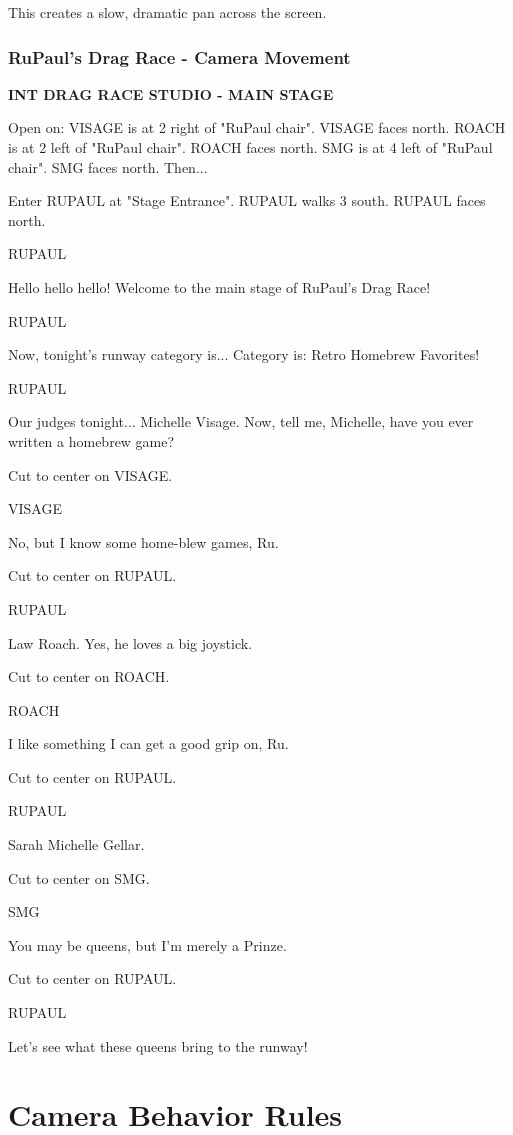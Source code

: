 \documentclass[11pt,letterpaper,oldstylefigures]{memoir}
\newcommand{\slugline}[1]{\nobreak\textbf{\MakeUppercase{#1}}\par\nobreak\vspace{1\baselineskip}}
\newcommand{\speaker}[1]{\nobreak\hspace*{0.333\textwidth}\MakeUppercase{#1}\par\nobreak\vspace{0.5\baselineskip}}
\newcommand{\dialogue}[1]{\nobreak\hspace*{0.25\textwidth}\begin{minipage}{0.5\textwidth}#1\end{minipage}\par\vspace{1\baselineskip}}
\newcommand{\stagedir}[1]{#1\par\vspace{1\baselineskip}}
\newenvironment{FountainExample}
  {\begingroup
  \ttfamily\small
   \setlength{\parindent}{0pt}
  \setlength{\parskip}{0.5em}
  \allowdisplaybreaks
  \setlength{\displaywidowpenalty}{0}
  \setlength{\widowpenalty}{0}
  \setlength{\clubpenalty}{0}
  \setlength{\interlinepenalty}{0}
}
  {\endgroup}
\begin{document}
This creates a slow, dramatic pan across the screen.

\subsubsection*{RuPaul's Drag Race - Camera Movement}
\label{ex:rupauls-drag-race-camera}

\begin{FountainExample}
\slugline{INT DRAG RACE STUDIO - MAIN STAGE}

\stagedir{Open on: VISAGE is at 2 right of "RuPaul chair". VISAGE faces north. ROACH is at 2 left of "RuPaul chair". ROACH faces north. SMG is at 4 left of "RuPaul chair". SMG faces north. Then...}
\stagedir{Enter RUPAUL at "Stage Entrance". RUPAUL walks 3 south. RUPAUL faces north.}

\speaker{RUPAUL}
\dialogue{Hello hello hello! Welcome to the main stage of RuPaul's Drag Race!}

\speaker{RUPAUL}
\dialogue{Now, tonight's runway category is... Category is: Retro Homebrew Favorites!}

\speaker{RUPAUL}
\dialogue{Our judges tonight... Michelle Visage. Now, tell me, Michelle, have you ever written a homebrew game?}

\stagedir{Cut to center on VISAGE.}

\speaker{VISAGE}
\dialogue{No, but I know some home-blew games, Ru.}

\stagedir{Cut to center on RUPAUL.}

\speaker{RUPAUL}
\dialogue{Law Roach. Yes, he loves a big joystick.}

\stagedir{Cut to center on ROACH.}

\speaker{ROACH}
\dialogue{I like something I can get a good grip on, Ru.}

\stagedir{Cut to center on RUPAUL.}

\speaker{RUPAUL}
\dialogue{Sarah Michelle Gellar.}

\stagedir{Cut to center on SMG.}

\speaker{SMG}
\dialogue{You may be queens, but I'm merely a Prinze.}

\stagedir{Cut to center on RUPAUL.}

\speaker{RUPAUL}
\dialogue{Let's see what these queens bring to the runway!}
\end{FountainExample}

\section{Camera Behavior Rules}
\end{document}
